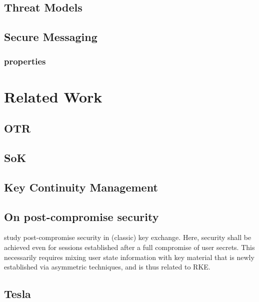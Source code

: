 \subsection{Threat Models}

\subsection{Secure Messaging}
	
	\subsubsection{properties}
\section{Related Work}
	\subsection{OTR}
	\subsection{SoK}
	\subsection{Key Continuity Management}
	\subsection{On post-compromise security}
	study post-compromise security 	in (classic) key exchange. Here, security shall be achieved even for sessions established after a full compromise of user secrets. This necessarily requires mixing user state information with key material that is newly established via asymmetric techniques, and is thus related to RKE.
	\subsection{Tesla}